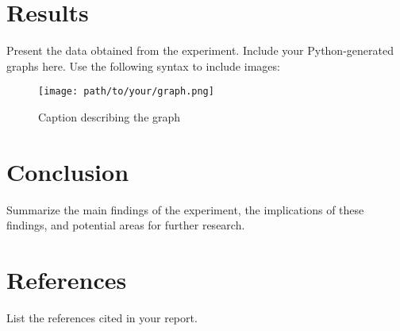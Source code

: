 \documentclass[12pt]{article}
\begin{document}
\section{Results}
    Present the data obtained from the experiment. Include your Python-generated graphs here. Use the following syntax to include images:
    
    \begin{figure}[h!]
        \centering
        \texttt{[image: path/to/your/graph.png]}
        \caption{Caption describing the graph}
        \label{fig:graph1}
    \end{figure}

\section{Conclusion}
    Summarize the main findings of the experiment, the implications of these findings, and potential areas for further research.

\section{References}
    List the references cited in your report.
\end{document}
